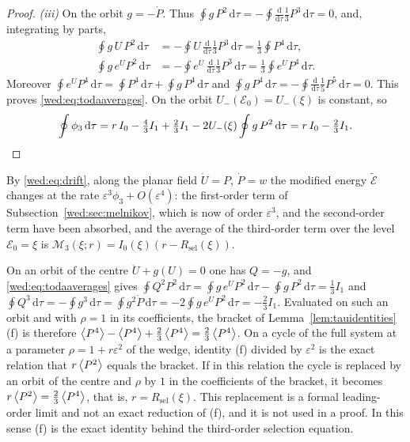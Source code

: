 \begin{proof}
\emph{(iii)} On the orbit $g=-\dot P$. Thus $\oint g\,P^2\,\mathrm d\tau=-\oint\tfrac{\mathrm d}{\mathrm d\tau}\tfrac13P^3\,\mathrm d\tau=0$, and, integrating by parts,
\begin{align*}
\oint g\,U\,P^2\,\mathrm d\tau&=-\oint U\,\tfrac{\mathrm d}{\mathrm d\tau}\tfrac13P^3\,\mathrm d\tau=\tfrac13\oint P^4\,\mathrm d\tau,\\
\oint g\,e^UP^2\,\mathrm d\tau&=-\oint e^U\,\tfrac{\mathrm d}{\mathrm d\tau}\tfrac13P^3\,\mathrm d\tau=\tfrac13\oint e^UP^4\,\mathrm d\tau .
\end{align*}
Moreover $\oint e^UP^4\,\mathrm d\tau=\oint P^4\,\mathrm d\tau+\oint g\,P^4\,\mathrm d\tau$ and $\oint g\,P^4\,\mathrm d\tau=-\oint\tfrac{\mathrm d}{\mathrm d\tau}\tfrac15P^5\,\mathrm d\tau=0$. This proves \eqref{wed:eq:todaaverages}. On the orbit $U_-(\mathcal E_0)=U_-(\xi)$ is constant, so
\[
\oint\phi_3\,\mathrm d\tau=r\,I_0-\tfrac43I_1+\tfrac23I_1-2U_-(\xi)\oint g\,P^2\,\mathrm d\tau=r\,I_0-\tfrac23I_1 .\qedhere
\]
\end{proof}
By \eqref{wed:eq:drift}, along the planar field $\dot U=P$, $\dot P=w$ the modified energy $\tilde{\mathcal E}$ changes at the rate $\varepsilon^3\phi_3+O(\varepsilon^4)$: the first-order term of Subsection~\ref{wed:sec:melnikov}, which is now of order $\varepsilon^3$, and the second-order term have been absorbed, and the average of the third-order term over the level $\mathcal E_0=\xi$ is $\mathcal M_3(\xi;r)=I_0(\xi)(r-R_{\mathrm{sel}}(\xi))$.

\begin{remark}\label{wed:rem:exactselection}
On an orbit of the centre $\ddot U+g(U)=0$ one has $Q=-g$, and \eqref{wed:eq:todaaverages} gives $\oint Q^2P^2\,\mathrm d\tau=\oint g\,e^UP^2\,\mathrm d\tau-\oint g\,P^2\,\mathrm d\tau=\tfrac13I_1$ and $\oint Q^3\,\mathrm d\tau=-\oint g^3\,\mathrm d\tau=\oint g^2\dot P\,\mathrm d\tau=-2\oint g\,e^UP^2\,\mathrm d\tau=-\tfrac23I_1$. Evaluated on such an orbit and with $\rho=1$ in its coefficients, the bracket of Lemma~\ref{lem:tauidentities}(f) is therefore $\left\langle P^4\right\rangle-\left\langle P^4\right\rangle+\tfrac23\left\langle P^4\right\rangle=\tfrac23\left\langle P^4\right\rangle$. On a cycle of the full system at a parameter $\rho=1+r\varepsilon^2$ of the wedge, identity (f) divided by $\varepsilon^2$ is the exact relation that $r\left\langle P^2\right\rangle$ equals the bracket. If in this relation the cycle is replaced by an orbit of the centre and $\rho$ by $1$ in the coefficients of the bracket, it becomes $r\left\langle P^2\right\rangle=\tfrac23\left\langle P^4\right\rangle$, that is, $r=R_{\mathrm{sel}}(\xi)$. This replacement is a formal leading-order limit and not an exact reduction of (f), and it is not used in a proof. In this sense (f) is the exact identity behind the third-order selection equation.
\end{remark}

